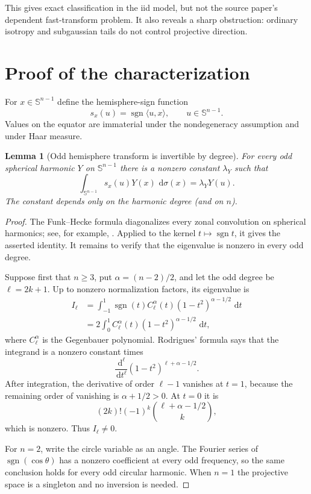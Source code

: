 \documentclass[11pt]{article}
\newtheorem{lemma}[theorem]{Lemma}
\newcommand{\Sph}{\mathbb S}
\newcommand{\sgn}{\operatorname{sgn}}
\newcommand{\dd}{\,\mathrm d}
\begin{document}
This gives exact classification in the iid model, but not the source paper's
dependent fast-transform problem.  It also reveals a sharp obstruction:
ordinary isotropy and subgaussian tails do not control projective direction.

\section{Proof of the characterization}

For $x\in\Sph^{n-1}$ define the hemisphere-sign function
\[
  s_x(u)=\sgn\langle u,x\rangle,
  \qquad u\in\Sph^{n-1}.
\]
Values on the equator are immaterial under the nondegeneracy assumption and
under Haar measure.

\begin{lemma}[Odd hemisphere transform is invertible by degree]
\label{lem:fh}
For every odd spherical harmonic $Y$ on $\Sph^{n-1}$ there is a nonzero
constant $\lambda_Y$ such that
\[
  \int_{\Sph^{n-1}} s_x(u)Y(x)\,\dd\sigma(x)
  =\lambda_Y Y(u).
\]
The constant depends only on the harmonic degree (and on $n$).
\end{lemma}

\begin{proof}
The Funk--Hecke formula diagonalizes every zonal convolution on spherical
harmonics; see, for example, \cite[Chapter 1]{DaiXu}.  Applied to the kernel
$t\mapsto\sgn t$, it gives the asserted identity.  It remains to verify that
the eigenvalue is nonzero in every odd degree.

Suppose first that $n\geq3$, put $\alpha=(n-2)/2$, and let the odd degree be
$\ell=2k+1$.  Up to nonzero normalization factors, its eigenvalue is
\begin{align*}
 I_\ell
 &=\int_{-1}^{1}\sgn(t)C_\ell^\alpha(t)
       (1-t^2)^{\alpha-1/2}\,\dd t\\
 &=2\int_0^1 C_\ell^\alpha(t)
       (1-t^2)^{\alpha-1/2}\,\dd t,
\end{align*}
where $C_\ell^\alpha$ is the Gegenbauer polynomial.  Rodrigues' formula says
that the integrand is a nonzero constant times
\[
 \frac{\dd^\ell}{\dd t^\ell}
 (1-t^2)^{\ell+\alpha-1/2}.
\]
After integration, the derivative of order $\ell-1$ vanishes at $t=1$,
because the remaining order of vanishing is $\alpha+1/2>0$.  At $t=0$ it is
\[
 (2k)!(-1)^k
 \binom{\ell+\alpha-1/2}{k},
\]
which is nonzero.  Thus $I_\ell\neq0$.

For $n=2$, write the circle variable as an angle.  The Fourier series of
$\sgn(\cos\theta)$ has a nonzero coefficient at every odd frequency, so the
same conclusion holds for every odd circular harmonic.  When $n=1$ the
projective space is a singleton and no inversion is needed.
\end{proof}
\end{document}
